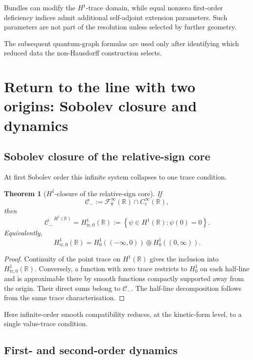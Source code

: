 \documentclass[11pt]{article}
\theoremstyle{plain}
\newtheorem{theorem}{Theorem}[section]
\theoremstyle{definition}
\begin{document}
Bundles can modify the \(H^1\)-trace domain, while equal nonzero first-order deficiency indices admit additional self-adjoint extension parameters. Such parameters are not part of the resolution unless selected by further geometry.

The subsequent quantum-graph formulas are used only after identifying which reduced data the non-Hausdorff construction selects.

\section{Return to the line with two origins: Sobolev closure and dynamics}
\label{sec:L2-return}

\subsection{Sobolev closure of the relative-sign core}
\label{subsec:L2-H1-return}

At first Sobolev order this infinite system collapses to one trace
condition.

\begin{theorem}[\(H^1\)-closure of the relative-sign core]
\label{thm:L2-H1-core}
If
\[
  \mathcal C_-
  :=
  \mathcal F^\infty_0(\mathbb R)
  \cap
  C_c^\infty(\mathbb R),
\]
then
\[
  \overline{\mathcal C_-}^{\,H^1(\mathbb R)}
  =
  H^1_{\mathrm{tr},0}(\mathbb R)
  :=
  \left\{
    \psi\in H^1(\mathbb R):
    \psi(0)=0
  \right\}.
\]
Equivalently,
\[
  H^1_{\mathrm{tr},0}(\mathbb R)
  =
  H^1_0((-\infty,0))
  \oplus
  H^1_0((0,\infty)).
\]
\end{theorem}

\begin{proof}
Continuity of the point trace on \(H^1(\mathbb R)\) gives the inclusion into
\(H^1_{\mathrm{tr},0}(\mathbb R)\). Conversely, a function with zero trace
restricts to \(H^1_0\) on each half-line and is approximable there by smooth
functions compactly supported away from the origin. Their direct sums belong
to \(\mathcal C_-\). The half-line decomposition follows from the same trace
characterisation.
\end{proof}

Here infinite-order smooth compatibility reduces, at the kinetic-form level, to a single value-trace condition.

\subsection{First- and second-order dynamics}
\label{subsec:L2-dynamics}
\end{document}
